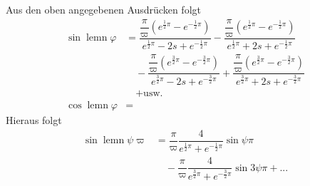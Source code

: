 Aus den oben angegebenen Ausdrücken folgt
\[
\begin{aligned}
\sin\operatorname{lemn}\varphi
&=\dfrac{\dfrac{\pi}{\varpi}(e^{\frac12\pi}-e^{-\frac12\pi})}
        {e^{\frac12\pi}-2s+e^{-\frac12\pi}}
 -\dfrac{\dfrac{\pi}{\varpi}(e^{\frac12\pi}-e^{-\frac12\pi})}
        {e^{\frac12\pi}+2s+e^{-\frac12\pi}}\\[5pt]
&\quad-\dfrac{\dfrac{\pi}{\varpi}(e^{\frac32\pi}-e^{-\frac32\pi})}
        {e^{\frac32\pi}-2s+e^{-\frac32\pi}}
 +\dfrac{\dfrac{\pi}{\varpi}(e^{\frac32\pi}-e^{-\frac32\pi})}
        {e^{\frac32\pi}+2s+e^{-\frac32\pi}}\\[5pt]
&\quad+\text{usw.}\\[5pt]
\cos\operatorname{lemn}\varphi&= 
\end{aligned}
\]
Hieraus folgt
\[
\begin{aligned}\sin\operatorname{lemn}\psi\varpi
&=\dfrac{\pi}{\varpi}\dfrac{4}{e^{\frac12\pi}+e^{-\frac12\pi}}\sin\psi\pi
\\[7pt]&\quad{}-\dfrac{\pi}{\varpi}\dfrac{4}{e^{\frac32\pi}+e^{-\frac32\pi}}\sin3\psi\pi
+\mathord{.}\mathord{.}\mathord{.}\end{aligned}
\]
\clearpage
\endgroup
